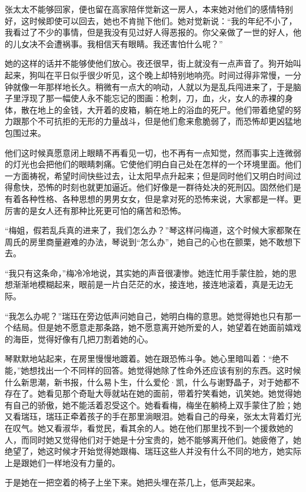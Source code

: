 \par 张太太不能够回家，便也留在高家陪伴觉新这一房人，本来她对他们的感情特别好，这时候即使可以回去，她也不肯抛下他们。她对觉新说：“我的年纪不小了，我看过了不少的事情，但是我没有见过好人得恶报的。你父亲做了一世的好人，他的儿女决不会遭祸事。我相信天有眼睛。我还害怕什么呢？”
\par 她的这样的话并不能够使他们放心。夜还很早，街上就没有一点声音了。狗开始叫起来，狗叫在平日似乎很少听见，这个晚上却特别地响亮。时间过得非常慢，一分钟就像一年那样地长久。稍微有一点大的响动，人就以为是乱兵闯进来了，于是脑子里浮现了那一幅使人永不能忘记的图画：枪刺，刀，血，火，女人的赤裸的身体，散在地上的金钱，大开着的皮箱，躺在地上的浴血的死尸。他们带着绝望的努力跟那个不可抗拒的无形的力量战斗，但是他们愈来愈脆弱了，而恐怖却更凶猛地包围过来。
\par 他们这时候真愿意闭上眼睛不再看见一切，也不再有一点知觉，然而事实上连微弱的灯光也会把他们的眼睛刺痛。它使他们明白自己处在怎样的一个环境里面。他们一方面祷祝，希望时间快些过去，让太阳早点升起来；但是同时他们又明白时间过得愈快，恐怖的时刻也就更加逼近。他们好像是一群待处决的死刑囚。固然他们是有着各种性格、各种思想的男男女女，但是拿对死的恐怖来说，大家都是一样。更厉害的是女人还有那种比死更可怕的痛苦和恐怖。
\par “梅姐，假若乱兵真的进来了，我们怎么办？”琴这样问梅道，这个时候大家都聚在周氏的房里商量避难的办法，琴说到“怎么办”，她自己的心也在颤栗，她不敢想下去。
\par “我只有这条命，”梅冷冷地说，其实她的声音很凄惨。她连忙用手蒙住脸，她的思想渐渐地模糊起来，眼前是一片白茫茫的水，接连地，接连地滚着，真是无边无际。
\par “我怎么办呢？”瑞珏在旁边低声问她自己，她明白梅的意思。她觉得她也只有那一个结局。但是她不愿意走那条路，她不愿意离开她所爱的人，她望着在她面前嬉戏的海臣，觉得好像有几把刀割着她的心。
\par 琴默默地站起来，在房里慢慢地踱着。她在跟恐怖斗争。她心里暗叫着：“绝不能，”她想找出一个不同样的回答。她觉得她除了性命外还应该有别的东西。这时候什么新思潮，新书报，什么易卜生，什么爱伦·凯，什么与谢野晶子，对于她都不存在了。她看见那个奇耻大辱就站在她的面前，带着狞笑看她，讥笑她。她觉得她有自己的骄傲，她不能活着忍受这个。她看看梅，梅坐在躺椅上双手蒙住了脸；她又看瑞珏，瑞珏正牵着孩子的手在那里淌眼泪。她看自己的母亲，张太太背着灯光在叹气。她又看淑华，看觉民，看其余的人。她在他们那里找不到一个援救她的人，而同时她又觉得他们对于她是十分宝贵的，她不能够离开他们。她疲倦了，她绝望了，她这时候才开始觉得她跟梅、瑞珏这些人并没有什么不同的地方，她实际上是跟她们一样地没有力量的。
\par 于是她在一把空着的椅子上坐下来。她把头埋在茶几上，低声哭起来。
